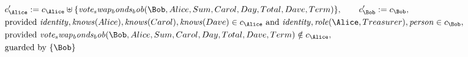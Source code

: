 \begin{align*}
&
c'_
{
\Alice
}
 := 
c_
{
\Alice
}
 \uplus 
\{
\mathit{
vote_swap_bonds_bob
}
(
\Bob
,
Alice
,
Sum
,
Carol
,
Day
,
Total
,
Dave
,
Term
)
\}
, \qquad 
c'_
{
\Bob
}
 := 
c_
{
\Bob
}
,\\
&
\text{provided } 
\mathit{
identity
}
,
\mathit{
knows
}
(
Alice
)
,
\mathit{
knows
}
(
Carol
)
,
\mathit{
knows
}
(
Dave
)
 \in c_
{
\Alice
}
 \text{ and } 
\mathit{
identity
}
,
\mathit{
role
}
(
\Alice
,
Treasurer
)
,
\mathit{
person
}
 \in c_
{
\Bob
}
,\\
&
\text{provided } 
\mathit{
vote_swap_bonds_bob
}
(
\Bob
,
Alice
,
Sum
,
Carol
,
Day
,
Total
,
Dave
,
Term
)
 \notin c_
{
\Alice
}
,\\
&
\text{guarded by } \{
\Bob
\}
\end{align*}

